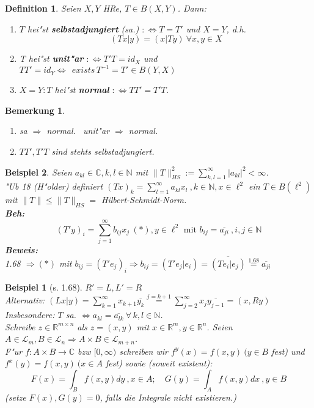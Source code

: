 \documentclass[a4paper,11pt]{book}
\newcommand{\R}{{\mathbb R}}
\newcommand{\C}{{\mathbb C}}
\newcommand{\N}{{\mathbb N}}
\newcommand{\ssL}{{\mathcal L}}
\newcommand{\begriff}[1]{\textbf{#1}} %
\newtheorem{Def}{Definition}[chapter]
\newtheorem*{BspNO}{Beispiel}
\newtheorem{Bsp}[Def]{Beispiel}
\newtheorem*{BemNO}{Bemerkung}
\theoremstyle{nonumberplain}
\begin{document}
\begin{Def}
Seien $X,Y$ HRe, $T \in B(X,Y)$. Dann:
\begin{enumerate}
\item[a)] $T$ hei"st \begriff{selbstadjungiert} (sa.) $: \Longleftrightarrow T = T'$ und $X = Y$, d.h.
\[
(Tx|y) = (x|Ty) \ \forall x,y \in X
\]

\item[b)] T hei"st \begriff{unit"ar} $: \Longleftrightarrow T'T = id_X$ und $TT' = id_Y \Longleftrightarrow \ \ exists\, T^{-1} = T' \in B(Y,X)$

\item[c)] $X = Y: T$ hei"st \begriff{normal} $: \Longleftrightarrow TT' = T'T$.
\end{enumerate}
\end{Def}


\begin{BemNO}
\begin{enumerate}
\item sa $\Rightarrow$ normal. \ unit"ar $\Rightarrow$ normal.

\item $TT', T'T$ sind stehts selbstadjungiert.
\end{enumerate}
\end{BemNO}


\begin{Bsp}
Seien $a_{kl} \in \C, k,l \in \N$ mit $\|T\|_{HS}^2 := \sum_{k,l = 1}^{\infty} |a_{kl}|^2 < \infty$.\\
"Ub 18 (H"older) definiert $(Tx)_k = \sum_{l=1}^{\infty} a_{kl}x_l \ , k \in \N, x \in \ell^2$ ein $T \in B(\ell^2)$ mit $\|T\| \leq \|T\|_{HS} = $ Hilbert-Schmidt-Norm.\\
\textbf{Beh:}
\[
(T'y)_i = \sum_{j=1}^{\infty} b_{ij}x_j \ (\ast), y \in \ell^2 \text{  mit } b_{ij} = \overline{a_{ji}} \ ,i,j \in \N
\]
\textbf{Beweis:}\\
1.68 $\Rightarrow (\ast)$ mit $b_{ij} = (T'e_j)_i \Rightarrow b_{ij} = (T'e_j|e_i) = \overline{(Te_i|e_j)} \stackrel{1.68}{=} \overline{a_{ji}}$
\end{Bsp}


\begin{BspNO}[s. 1.68]
$R' = L, L' = R$\\
Alternativ: $(Lx|y) = \sum_{k=1}^{\infty} x_{k+1} \overline{y_k} \stackrel{j=k+1}{=} \sum_{j=2}^{\infty} x_j \overline{y_{j-1}} = (x,Ry)$\\
Insbesondere: $T$ sa. $\Longleftrightarrow a_{kl} = \overline{a_{lk}} \ \forall\, k,l \in \N$.\\
Schreibe $z \in \R^{m \times n}$ als $z = (x,y)$ mit $x \in \R^m, y \in \R^n$. Seien $A \in \ssL_m, B \in \ssL_n \Rightarrow A \times B \in \ssL_{m+n}$.\\
F"ur $f: A \times B \rightarrow \C$ bzw $[0,\infty)$ schreiben wir $f^y(x) = f(x,y) \ (y \in B$ fest) und $f^x(y) = f(x,y) \ (x \in A$ fest) sowie (soweit existent):
\[
F(x) = \int_B f(x,y)dy \ , x \in A; \quad G(y) = \int_A f(x,y)dx \ , y \in B
\]
(setze $F(x),G(y) = 0$, falls die Integrale nicht existieren.)
\end{BspNO}
\end{document}
